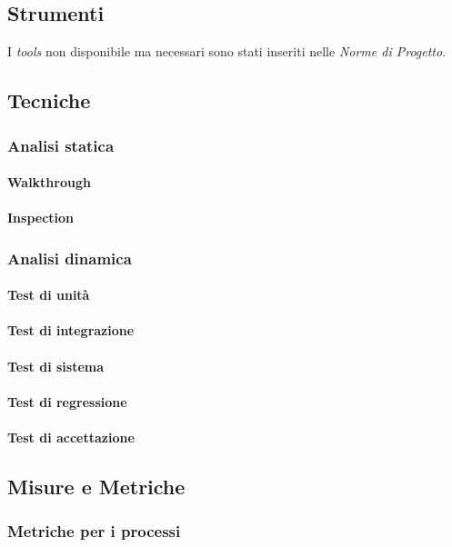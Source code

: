 	\subsection{Strumenti}
		I \emph{tools} non disponibile ma necessari sono stati inseriti nelle \emph{Norme di Progetto}. %
	
	\subsection{Tecniche}
		\subsubsection{Analisi statica}
			\paragraph{Walkthrough}
			\paragraph{Inspection}
		\subsubsection{Analisi dinamica}
			\paragraph{Test di unità}
			\paragraph{Test di integrazione}
			\paragraph{Test di sistema}
			\paragraph{Test di regressione}
			\paragraph{Test di accettazione}
	
	\subsection{Misure e Metriche}
		\subsubsection{Metriche per i processi}
